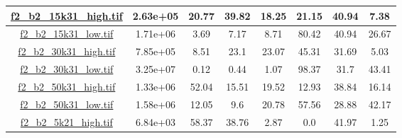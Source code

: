 \begin{table}[h]
\begin{adjustwidth}{-1cm}{}
\begin{tabular}{ |c |c |c |c |c |c |c |c |}
{\hyperlink{histf2_b2_15k31_high}{\color{blue}f2\_b2\_15k31\_high.tif}} & 2.63e+05 & 20.77 & 39.82 & 18.25 & 21.15 & 40.94 & 7.38\\ \hline
{\hyperlink{histf2_b2_15k31_low}{\color{blue}f2\_b2\_15k31\_low.tif}} & 1.71e+06 & 3.69 & 7.17 & 8.71 & 80.42 & 40.94 & 26.67\\ \hline
{\hyperlink{histf2_b2_30k31_high}{\color{blue}f2\_b2\_30k31\_high.tif}} & 7.85e+05 & 8.51 & 23.1 & 23.07 & 45.31 & 31.69 & 5.03\\ \hline
{\hyperlink{histf2_b2_30k31_low}{\color{blue}f2\_b2\_30k31\_low.tif}} & 3.25e+07 & 0.12 & 0.44 & 1.07 & 98.37 & 31.7 & 43.41\\ \hline
{\hyperlink{histf2_b2_50k31_high}{\color{blue}f2\_b2\_50k31\_high.tif}} & 1.33e+06 & 52.04 & 15.51 & 19.52 & 12.93 & 38.84 & 16.14\\ \hline
{\hyperlink{histf2_b2_50k31_low}{\color{blue}f2\_b2\_50k31\_low.tif}} & 1.58e+06 & 12.05 & 9.6 & 20.78 & 57.56 & 28.88 & 42.17\\ \hline
{\hyperlink{histf2_b2_5k21_high}{\color{blue}f2\_b2\_5k21\_high.tif}} & 6.84e+03 & 58.37 & 38.76 & 2.87 & 0.0 & 41.97 & 1.25\\ \hline
\end{tabular}
\end{adjustwidth}
\end{table}

